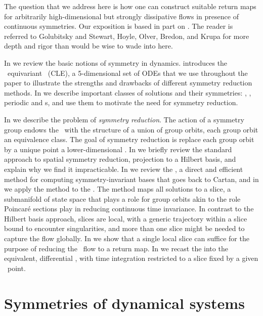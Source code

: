 \documentclass[final,number,sort&compress]{elsarticle}
\begin{document}
The question that we address here is how one can construct
suitable return maps for arbitrarily high-dimensional but
strongly dissipative flows in presence of continuous
symmetries. Our exposition is based in part on
. The reader is
referred to Golubitsky and
Stewart, Hoyle,
Olver, Bredon, and
Krupa for more depth and rigor than would be wise
to wade into here.

In  we review the basic notions of symmetry
in dynamics.  introduces the \
equi\-vari\-ant \cLe\ (CLE), a 5-dimen\-sion\-al set of ODEs that we
use throughout the paper to illustrate the strengths and
drawbacks of different symmetry reduction methods. In
 we describe important classes of solutions
and their symmetries: \eqva, \reqva, periodic and \rpo s, and use
them to motivate the need for symmetry reduction.

In  we describe the problem of
\emph{symmetry reduction}. The action of a symmetry group
endows the \statesp\ with the structure of a union of group
orbits, each group orbit an equivalence class. The goal of
{symmetry reduction} is replace each group orbit by a unique
point a lower-dimensional {\em \reducedsp}.
In  we briefly review the standard approach
to spatial symmetry reduction, projection to a Hilbert basis,
and explain why we find it impracticable.
In  we review the {\mframes}, a direct and
efficient method  for computing symmetry-in\-vari\-ant bases that
goes back to Cartan, and in \refsect{sec:CLeMovFr} we apply
the method to the \cLe. The method maps all solutions to a
slice, a submanifold  of state space that plays a role for
group orbits akin to the role Poincar\'e sections play in
reducing continuous time invariance. In contrast to the
Hilbert basis approach, slices are local, with a generic
trajectory within a slice bound to encounter singularities,
and more than one slice might be needed to capture the flow
globally. In  we show that a single
local slice can suffice for the purpose of reducing the \cLe\
flow to a return map. In  we recast
the {\mframes} into the equivalent, differential \mslices,
with time integration restricted to a slice fixed by a given
\statesp\ point.


\section{\label{s:symDyn} Symmetries of dynamical systems}
\end{document}
